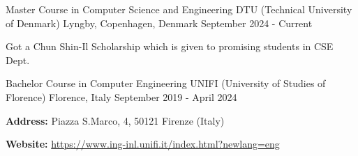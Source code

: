

\begin{cventries}

  \cventry
    {Master Course in Computer Science and Engineering} %
    {DTU (Technical University of Denmark)} %
    {Lyngby, Copenhagen, Denmark} %
    {September 2024 - Current} %
    {
      \begin{cvitems} %
        \item {Got a Chun Shin-Il Scholarship which is given to promising students in CSE Dept.}
      \end{cvitems}
    }

  \cventry
    {Bachelor Course in Computer Engineering} %
    {UNIFI (University of Studies of Florence)} %
    {Florence, Italy} %
    {September 2019 - April 2024} %
    {
      \begin{cvitems} %
        \item {\textbf{Address:} Piazza S.Marco, 4, 50121 Firenze (Italy)}
        \item {\textbf{Website:} \href{https://www.ing-inl.unifi.it/index.html?newlang=eng}{https://www.ing-inl.unifi.it/index.html?newlang=eng}}
      \end{cvitems}
    }

\end{cventries}
